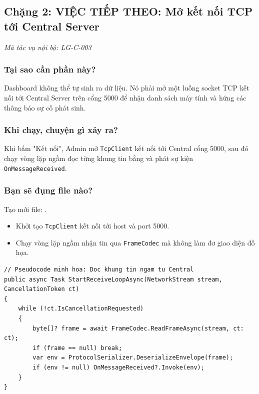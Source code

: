 \documentclass[12pt,a4paper]{article}
\begin{document}
\subsection{Chặng 2: VIỆC TIẾP THEO: Mở kết nối TCP tới Central Server}
{\footnotesize\color{lgGray}\textit{Mã tác vụ nội bộ: LG-C-003}}\par
\vspace{2mm}

\subsubsection{Tại sao cần phần này?}
Dashboard không thể tự sinh ra dữ liệu. Nó phải mở một luồng socket TCP kết nối tới Central Server trên cổng 5000 để nhận danh sách máy tính và hứng các thông báo sự cố phát sinh.

\subsubsection{Khi chạy, chuyện gì xảy ra?}
Khi bấm "Kết nối", Admin mở \texttt{TcpClient} kết nối tới Central cổng 5000, sau đó chạy vòng lặp ngầm đọc từng khung tin bằng  và phát sự kiện \texttt{OnMessageReceived}.

\subsubsection{Bạn sẽ đụng file nào?}
Tạo mới file: .

\begin{orientationbox}
\begin{itemize}[leftmargin=1.5em, itemsep=1pt]
  \item Khởi tạo \texttt{TcpClient} kết nối tới host và port 5000.
  \item Chạy vòng lặp ngầm nhận tin qua \texttt{FrameCodec} mà không làm đơ giao diện đồ họa.
\end{itemize}
\end{orientationbox}

\begin{lstlisting}[language=CSharp, caption={Pseudocode minh họa: Vòng lặp nhận tin ngầm của Admin}]
// Pseudocode minh hoa: Doc khung tin ngam tu Central
public async Task StartReceiveLoopAsync(NetworkStream stream, CancellationToken ct)
{
    while (!ct.IsCancellationRequested)
    {
        byte[]? frame = await FrameCodec.ReadFrameAsync(stream, ct: ct);
        if (frame == null) break;
        var env = ProtocolSerializer.DeserializeEnvelope(frame);
        if (env != null) OnMessageReceived?.Invoke(env);
    }
}
\end{lstlisting}
\end{document}
